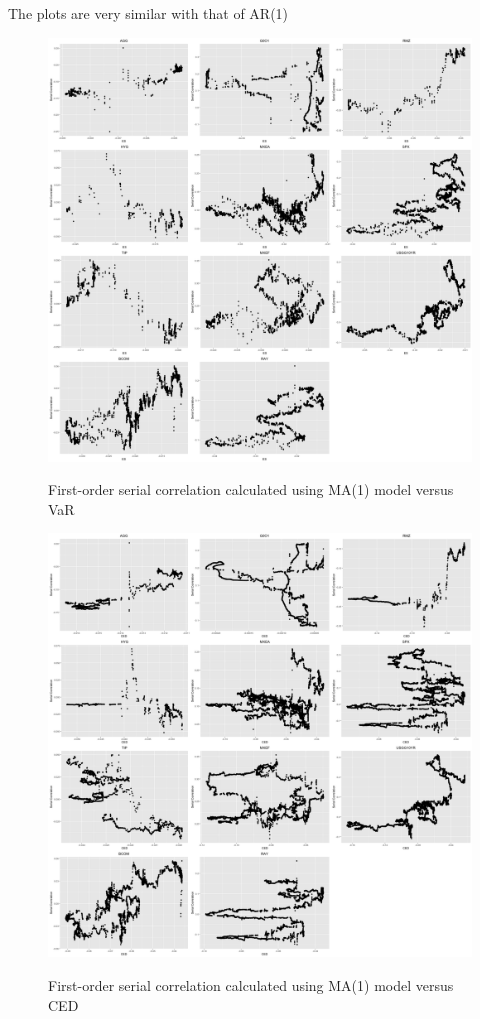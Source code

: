 \documentclass[12pt]{article}
\begin{document}
The plots are very similar with that of AR(1) 

\iffalse

\begin{figure}
  \caption{First-order serial correlation calculated using MA(1) model versus VaR}
  \includegraphics[width = 1\textwidth]{../results/SerCol-ES5yrMA1}
  \label{fig:SerCol-ES5yrMA1}
\end{figure}

\begin{figure}
  \caption{First-order serial correlation calculated using MA(1) model versus CED}
  \includegraphics[width = 1\textwidth]{../results/SerCol-CED5yr3monMA1}
  \label{fig:SerCol-CED5yr3monMA1}
\end{figure}
\end{document}
